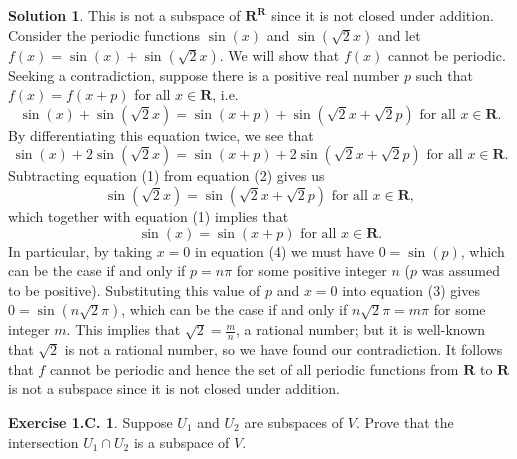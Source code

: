 \documentclass[12pt]{article}
\theoremstyle{definition}
\theoremstyle{exercise}
\newtheorem{exercise}{Exercise 1.C.}
\theoremstyle{solution}
\newtheorem*{solution}{Solution}
\newcommand{\R}{\mathbf{R}}
\begin{document}
\begin{solution}
    This is not a subspace of \( \R^{\R} \) since it is not closed under addition. Consider the periodic functions \( \sin(x) \) and \( \sin \left( \sqrt{2} x \right) \) and let \( f(x) = \sin(x) + \sin \left( \sqrt{2} x \right) \). We will show that \( f(x) \) cannot be periodic. Seeking a contradiction, suppose there is a positive real number \( p \) such that \( f(x) = f(x + p) \) for all \( x \in \R \), i.e.\
    \begin{equation}
        \sin(x) + \sin \left( \sqrt{2} x \right) = \sin(x + p) + \sin \left( \sqrt{2} x + \sqrt{2} p \right) \text{ for all } x \in \R.
    \end{equation}
    By differentiating this equation twice, we see that
    \begin{equation}
        \sin(x) + 2 \sin \left( \sqrt{2} x \right) = \sin(x + p) + 2 \sin \left( \sqrt{2} x + \sqrt{2} p \right) \text{ for all } x \in \R.
    \end{equation}
    Subtracting equation (1) from equation (2) gives us
    \begin{equation}
        \sin \left( \sqrt{2} x \right) = \sin \left( \sqrt{2} x + \sqrt{2} p \right) \text{ for all } x \in \R,
    \end{equation}
    which together with equation (1) implies that
    \begin{equation}
        \sin(x) = \sin(x + p) \text{ for all } x \in \R.
    \end{equation}
    In particular, by taking \( x = 0 \) in equation (4) we must have \( 0 = \sin(p) \), which can be the case if and only if \( p = n \pi \) for some positive integer \( n \) (\( p \) was assumed to be positive). Substituting this value of \( p \) and \( x = 0 \) into equation (3) gives \( 0 = \sin \left( n \sqrt{2} \pi \right) \), which can be the case if and only if \( n \sqrt{2} \pi = m \pi \) for some integer \( m \). This implies that \( \sqrt{2} = \tfrac{m}{n} \), a rational number; but it is well-known that \( \sqrt{2} \) is not a rational number, so we have found our contradiction. It follows that \( f \) cannot be periodic and hence the set of all periodic functions from \( \R \) to \( \R \) is not a subspace since it is not closed under addition.
\end{solution}

\begin{exercise}
\label{ex:10}
    Suppose \( U_1 \) and \( U_2 \) are subspaces of \( V \). Prove that the intersection \( U_1 \cap U_2 \) is a subspace of \( V \).
\end{exercise}
\end{document}
